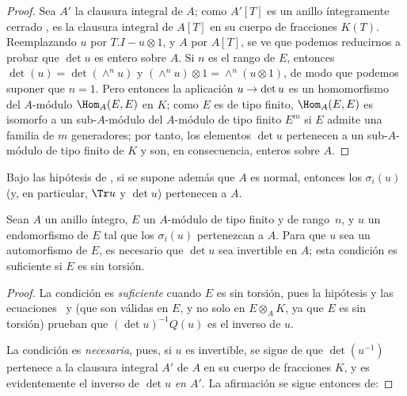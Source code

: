 \documentclass[oneside,10pt]{amsart}
\makeatletter
\newcommand{\ega@arrow}[2]{\mathchoice{#1}{#2}{#2}{#2}}
\renewcommand{\to}{\ega@arrow{\longrightarrow}{\rightarrow}}
\newcommand{\oldpage}[2][]{\marginnote{\normalfont\footnotesize\textbf{#1}~|~#2}\ignorespaces}
\let\EGAOriginalLabel\label
\renewcommand{\label}[1]{\phantomsection\EGAOriginalLabel{#1}}
\makeatother
\begin{document}
\begin{proof}
Sea $A'$ la clausura integral de $A$;
como $A'[T]$ es un anillo íntegramente cerrado \cite[p.~99]{II-24}, es la clausura integral de $A[T]$ en su cuerpo de fracciones $K(T)$.
Reemplazando $u$ por $T.I-u\otimes1$, y $A$ por $A[T]$, se ve que podemos reducirnos a probar que $\det u$ es entero sobre $A$.
Si $n$ es el rango de $E$, entonces $\det(u)=\det(\wedge^n u)$ y $(\wedge^n u)\otimes1=\wedge^n(u\otimes1)$, de modo que podemos suponer que $n=1$.
Pero entonces la aplicación $u\to\det u$ es un homomorfismo del $A$-módulo $\Hom_A(E,E)$ en $K$;
como $E$ es de tipo finito, $\Hom_A(E,E)$ es isomorfo a un sub-$A$-módulo del $A$-módulo de tipo finito $E^m$ si $E$ admite una familia de $m$ generadores; por tanto, los elementos $\det u$ pertenecen a un sub-$A$-módulo de tipo finito de $K$ y son, en consecuencia, enteros sobre $A$.
\end{proof}

\oldpage[II]{122}
\begin{corollary}[6.4.4]
\label{II.6.4.4}
Bajo las hipótesis de , si se supone además que $A$ es normal, entonces los $\sigma_i(u)$ (y, en particular, $\Tr u$ y $\det u$) pertenecen a $A$.
\end{corollary}

\begin{proposition}[6.4.5]
\label{II.6.4.5}
Sean $A$ un anillo íntegro, $E$ un $A$-módulo de tipo finito y de rango~$n$, y $u$ un endomorfismo de $E$ tal que los $\sigma_i(u)$ pertenezcan a $A$.
Para que $u$ sea un automorfismo de $E$, es necesario que $\det u$ sea invertible en $A$;
esta condición es suficiente si $E$ es sin torsión.
\end{proposition}

\begin{proof}
La condición es \emph{suficiente} cuando $E$ es sin torsión, pues la hipótesis y las ecuaciones~ y  (que son válidas en $E$, y no solo en $E\otimes_A K$, ya que $E$ es sin torsión) prueban que $(\det u)^{-1}Q(u)$ es el inverso de $u$.

La condición es \emph{necesaria}, pues, si $u$ es invertible, se sigue de  que $\det(u^{-1})$ pertenece a la clausura integral $A'$ de $A$ en su cuerpo de fracciones $K$, y es evidentemente el inverso de $\det u$ \emph{en $A'$}.
La afirmación se sigue entonces de:
\end{proof}
\end{document}
